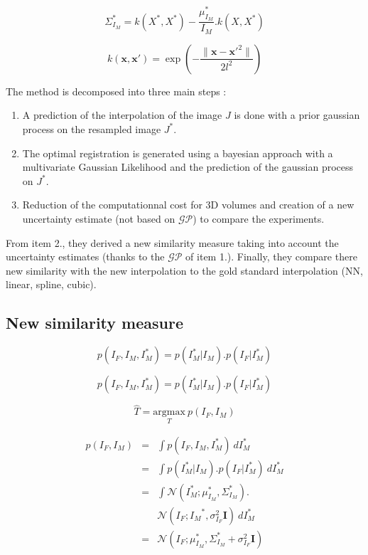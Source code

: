 \documentclass[10pt,twocolumn,letterpaper]{article}
\begin{document}
\begin{equation}
\Sigma_{I_M}^*=k(X^*,X^*)-\frac{\mu_{I_M}^*}{I_M}.k(X,X^*)
\end{equation}\label{eq:sigma}

\begin{equation}
k(\mathbf{x},\mathbf{x'}) =\exp(-\frac{\|{\mathbf{x}-\mathbf{x'}}^2\|}{2l^2})
\end{equation}\label{eq:k}

The method is decomposed into three main steps :
\begin{enumerate}
\item A prediction of the interpolation of the image $J$ is done with a prior gaussian process on the resampled image $J^*$.
\item The optimal registration is generated using a bayesian approach with a multivariate Gaussian Likelihood and the prediction of the gaussian process on $J^*$.
\item Reduction of the computationnal cost for 3D volumes and creation of a new uncertainty estimate (not based on $\mathcal{GP}$) to compare the experiments.
\end{enumerate}

From item 2., they derived a new similarity measure taking into account the uncertainty estimates (thanks to the $\mathcal{GP}$ of item 1.).
Finally, they compare there new similarity with the new interpolation to the gold standard interpolation (NN, linear, spline, cubic).

\subsection{New similarity measure}\label{subsec:sim}

\begin{equation}
p(I_F,I_M,I_M^*)=p(I_M^*|I_M).p(I_F|I_M^*)
\end{equation}\label{eq:joint}

\begin{equation}
p(I_F,I_M,I_M^*)=p(I_M^*|I_M).p(I_F|I_M^*)
\end{equation}\label{eq:joint}

\begin{equation}
\hat{T}=\underset{T}{\textrm{argmax}}~ p(I_F,I_M)
\end{equation}\label{eq:arg}

\begin{equation}
\begin{array} {lcl} 
p(I_F,I_M) & = & \int p(I_F,I_M,I_M^*)~dI_M^*\\ 
& = &  \int p(I_M^*|I_M).p(I_F|I_M^*)~dI_M^*\\
& = &  \int \mathcal{N}(I_M^*;\mu_{I_M}^*,\Sigma_{I_M}^*).\\
&   &  \mathcal{N}(I_F;{I_M}^*,\sigma_{I_F}^2\mathbf{I})~dI_M^*\\
& = &  \mathcal{N}(I_F;\mu_{I_M}^*,\Sigma_{I_M}^*+\sigma_{I_F}^2\mathbf{I})
\end{array}
\end{equation}
\end{document}
